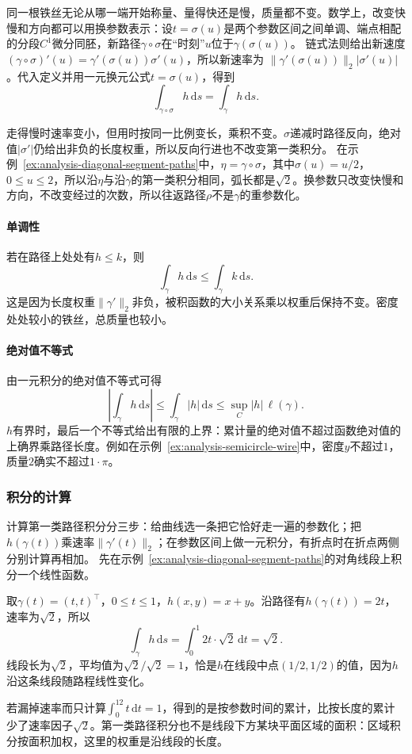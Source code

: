 同一根铁丝无论从哪一端开始称量、量得快还是慢，质量都不变。数学上，改变快慢和方向都可以用换参数表示：设$t=\sigma(u)$是两个参数区间之间单调、端点相配的分段$C^1$微分同胚，新路径$\gamma\circ\sigma$在“时刻”$u$位于$\gamma(\sigma(u))$。
链式法则给出新速度$(\gamma\circ\sigma)'(u)=\gamma'(\sigma(u))\sigma'(u)$，所以新速率为
$\lVert\gamma'(\sigma(u))\rVert_2|\sigma'(u)|$。代入定义并用一元换元公式$t=\sigma(u)$，得到
\[
 \int_{\gamma\circ\sigma}h\,\mathrm ds=\int_\gamma h\,\mathrm ds.
\]

走得慢时速率变小，但用时按同一比例变长，乘积不变。$\sigma$递减时路径反向，绝对值$|\sigma'|$仍给出非负的长度权重，所以反向行进也不改变第一类积分。
在示例~\ref{ex:analysis-diagonal-segment-paths}中，$\eta=\gamma\circ\sigma$，其中$\sigma(u)=u/2$，$0\leq u\leq2$，所以沿$\eta$与沿$\gamma$的第一类积分相同，弧长都是$\sqrt2$。换参数只改变快慢和方向，不改变经过的次数，所以往返路径$\rho$不是$\gamma$的重参数化。

\paragraph{单调性}

若在路径上处处有$h\leq k$，则
\[
 \int_\gamma h\,\mathrm ds\leq\int_\gamma k\,\mathrm ds.
\]
这是因为长度权重$\lVert\gamma'\rVert_2$非负，被积函数的大小关系乘以权重后保持不变。密度处处较小的铁丝，总质量也较小。

\paragraph{绝对值不等式}

由一元积分的绝对值不等式可得
\[
 \left|\int_\gamma h\,\mathrm ds\right|
 \leq\int_\gamma|h|\,\mathrm ds
 \leq\sup_C|h|\,\ell(\gamma).
\]
$h$有界时，最后一个不等式给出有限的上界：累计量的绝对值不超过函数绝对值的上确界乘路径长度。例如在示例~\ref{ex:analysis-semicircle-wire}中，密度$y$不超过$1$，质量$2$确实不超过$1\cdot\pi$。

\subsubsection{积分的计算}

计算第一类路径积分分三步：给曲线选一条把它恰好走一遍的参数化；把$h(\gamma(t))$乘速率$\lVert\gamma'(t)\rVert_2$；在参数区间上做一元积分，有折点时在折点两侧分别计算再相加。
先在示例~\ref{ex:analysis-diagonal-segment-paths}的对角线段上积分一个线性函数。
\begin{example}[沿对角线段积分$x+y$]
取$\gamma(t)=(t,t)^\top$，$0\leq t\leq1$，$h(x,y)=x+y$。沿路径有$h(\gamma(t))=2t$，速率为$\sqrt2$，所以
\[
 \int_\gamma h\,\mathrm ds=\int_0^1 2t\cdot\sqrt2\,\mathrm dt=\sqrt2.
\]
线段长为$\sqrt2$，平均值为$\sqrt2/\sqrt2=1$，恰是$h$在线段中点$(1/2,1/2)$的值，因为$h$沿这条线段随路程线性变化。
\end{example}
若漏掉速率而只计算$\int_0^12t\,\mathrm dt=1$，得到的是按参数时间的累计，比按长度的累计少了速率因子$\sqrt2$。第一类路径积分也不是线段下方某块平面区域的面积：区域积分按面积加权，这里的权重是沿线段的长度。

